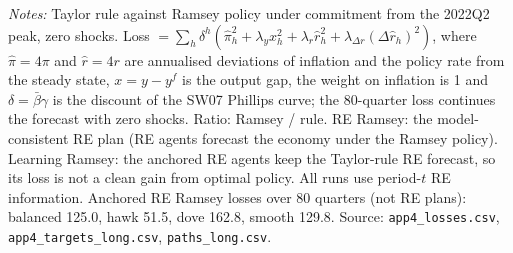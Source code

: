 \begin{table}[tbp]
\begin{minipage}{\linewidth}
\textit{Notes:} Taylor rule against Ramsey policy under commitment from the 2022Q2 peak, zero shocks. Loss $= \sum_h \delta^h(\hat\pi_h^2 + \lambda_y x_h^2 + \lambda_r \hat r_h^2 + \lambda_{\Delta r} (\Delta \hat r_h)^2)$, where $\hat\pi = 4\pi$ and $\hat r = 4r$ are annualised deviations of inflation and the policy rate from the steady state, $x = y-y^f$ is the output gap, the weight on inflation is 1 and $\delta = \bar\beta\gamma$ is the discount of the SW07 Phillips curve; the 80-quarter loss continues the forecast with zero shocks. Ratio: Ramsey / rule. RE Ramsey: the model-consistent RE plan (RE agents forecast the economy under the Ramsey policy). Learning Ramsey: the anchored RE agents keep the Taylor-rule RE forecast, so its loss is not a clean gain from optimal policy. All runs use period-$t$ RE information. Anchored RE Ramsey losses over 80 quarters (not RE plans): balanced 125.0, hawk 51.5, dove 162.8, smooth 129.8. Source: \texttt{app4\_losses.csv}, \texttt{app4\_targets\_long.csv}, \texttt{paths\_long.csv}.
\end{minipage}
\end{table}
